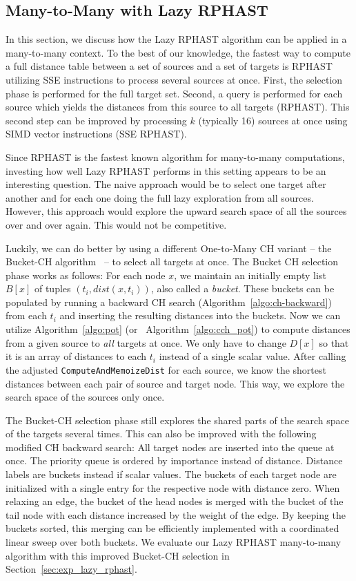 \documentclass[manuscript,review]{acmart}
\begin{document}
\subsection{Many-to-Many with Lazy RPHAST}

In this section, we discuss how the Lazy RPHAST algorithm can be applied in a many-to-many context.
To the best of our knowledge, the fastest way to compute a full distance table between a set of sources and a set of targets is RPHAST utilizing SSE instructions to process several sources at once.
First, the selection phase is performed for the full target set.
Second, a query is performed for each source which yields the distances from this source to all targets (RPHAST).
This second step can be improved by processing $k$ (typically 16) sources at once using SIMD vector instructions (SSE RPHAST).

Since RPHAST is the fastest known algorithm for many-to-many computations, investing how well Lazy RPHAST performs in this setting appears to be an interesting question.
The naive approach would be to select one target after another and for each one doing the full lazy exploration from all sources.
However, this approach would explore the upward search space of all the sources over and over again.
This would not be competitive.

Luckily, we can do better by using a different One-to-Many CH variant -- the Bucket-CH algorithm~\cite{gssv-erlrn-12} -- to select all targets at once.
The Bucket CH selection phase works as follows:
For each node $x$, we maintain an initially empty list $B[x]$ of tuples $(t_i, dist(x,t_i))$, also called a \emph{bucket}.
These buckets can be populated by running a backward CH search (Algorithm~\ref{algo:ch-backward}) from each $t_i$ and inserting the resulting distances into the buckets.
Now we can utilize Algorithm~\ref{algo:pot} (or~ Algorithm~\ref{algo:cch_pot}) to compute distances from a given source to \emph{all} targets at once.
We only have to change $D[x]$ so that it is an array of distances to each $t_i$ instead of a single scalar value.
After calling the adjusted \texttt{ComputeAndMemoizeDist} for each source, we know the shortest distances between each pair of source and target node.
This way, we explore the search space of the sources only once.

The Bucket-CH selection phase still explores the shared parts of the search space of the targets several times.
This can also be improved with the following modified CH backward search:
All target nodes are inserted into the queue at once.
The priority queue is ordered by importance instead of distance.
Distance labels are buckets instead if scalar values.
The buckets of each target node are initialized with a single entry for the respective node with distance zero.
When relaxing an edge, the bucket of the head nodes is merged with the bucket of the tail node with each distance increased by the weight of the edge.
By keeping the buckets sorted, this merging can be efficiently implemented with a coordinated linear sweep over both buckets.
We evaluate our Lazy RPHAST many-to-many algorithm with this improved Bucket-CH selection in Section~\ref{sec:exp_lazy_rphast}.
\end{document}
